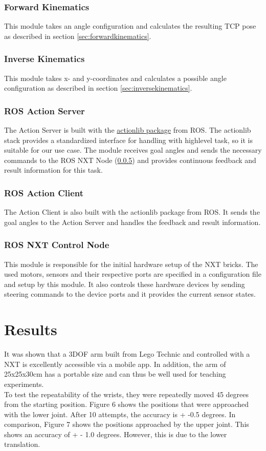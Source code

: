 \documentclass[conference]{IEEEtran}
\begin{document}
\subsubsection{Forward Kinematics}
This module takes an angle configuration and calculates the resulting TCP pose as described in section \ref{sec:forwardkinematics}.

\subsubsection{Inverse Kinematics}
This module takes x- and y-coordinates and calculates a possible angle configuration as described in section \ref{sec:inversekinematics}.

\subsubsection{ROS Action Server}\label{sec:actionserver}
The Action Server is built with the \href{https://wiki.ros.org/actionlib}{actionlib package} from ROS. The actionlib stack provides a standardized interface for handling with highlevel task, so it is suitable for our use case. The module receives goal angles and sends the necessary commands to the ROS NXT Node (\ref{sec:nxt_node}) and provides continuous feedback and result information for this task.

\subsubsection{ROS Action Client}\label{sec:actionclient}
The Action Client is also built with the actionlib package from ROS. It sends the goal angles to the Action Server and handles the feedback and result information. 

\subsubsection{ROS NXT Control Node}\label{sec:nxt_node}
This module is responsible for the initial hardware setup of the NXT bricks. The used motors, sensors and their respective ports are specified in a configuration file and setup by this module. It also controls these hardware devices by sending steering commands to the device ports and it provides the current sensor states.

\section{Results}
It was shown that a 3DOF arm built from Lego Technic and controlled with a NXT is excellently accessible via a mobile app. In addition, the arm of 25x25x30cm has a portable size and can thus be well used for teaching experiments.\\
To test the repeatability of the wrists, they were repeatedly moved 45 degrees from the starting position. Figure 6 shows the positions that were approached with the lower joint. After 10 attempts, the accuracy is + -0.5 degrees. In comparison, Figure 7 shows the positions approached by the upper joint. This shows an accuracy of + - 1.0 degrees. However, this is due to the lower translation.
\end{document}
